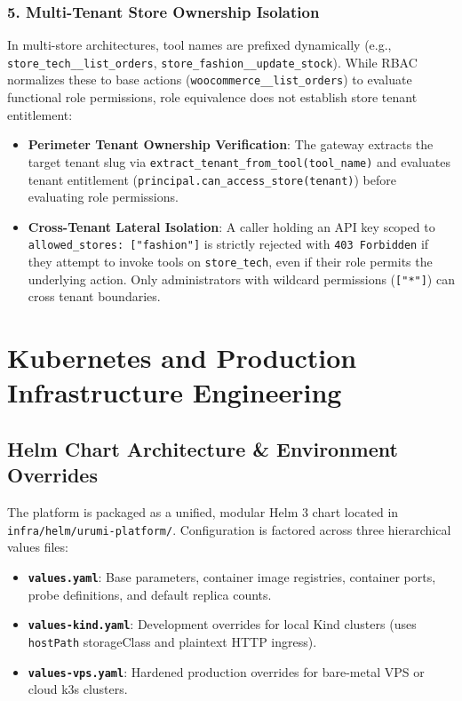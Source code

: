 \documentclass[11pt,a4paper]{article}
\begin{document}
\subsubsection{5. Multi-Tenant Store Ownership Isolation}
In multi-store architectures, tool names are prefixed dynamically (e.g., \texttt{store\_tech\_\_list\_orders}, \texttt{store\_fashion\_\_update\_stock}). While RBAC normalizes these to base actions (\texttt{woocommerce\_\_list\_orders}) to evaluate functional role permissions, role equivalence does not establish store tenant entitlement:
\begin{itemize}[leftmargin=*]
    \item \textbf{Perimeter Tenant Ownership Verification}: The gateway extracts the target tenant slug via \texttt{extract\_tenant\_from\_tool(tool\_name)} and evaluates tenant entitlement (\texttt{principal.can\_access\_store(tenant)}) before evaluating role permissions.
    \item \textbf{Cross-Tenant Lateral Isolation}: A caller holding an API key scoped to \texttt{allowed\_stores: ["fashion"]} is strictly rejected with \texttt{403 Forbidden} if they attempt to invoke tools on \texttt{store\_tech}, even if their role permits the underlying action. Only administrators with wildcard permissions (\texttt{["*"]}) can cross tenant boundaries.
\end{itemize}

\section{Kubernetes and Production Infrastructure Engineering}

\subsection{Helm Chart Architecture \& Environment Overrides}
The platform is packaged as a unified, modular Helm 3 chart located in \texttt{infra/helm/urumi-platform/}. Configuration is factored across three hierarchical values files:
\begin{itemize}[leftmargin=*]
    \item \textbf{\texttt{values.yaml}}: Base parameters, container image registries, container ports, probe definitions, and default replica counts.
    \item \textbf{\texttt{values-kind.yaml}}: Development overrides for local Kind clusters (uses \texttt{hostPath} storageClass and plaintext HTTP ingress).
    \item \textbf{\texttt{values-vps.yaml}}: Hardened production overrides for bare-metal VPS or cloud k3s clusters.
\end{itemize}
\end{document}
